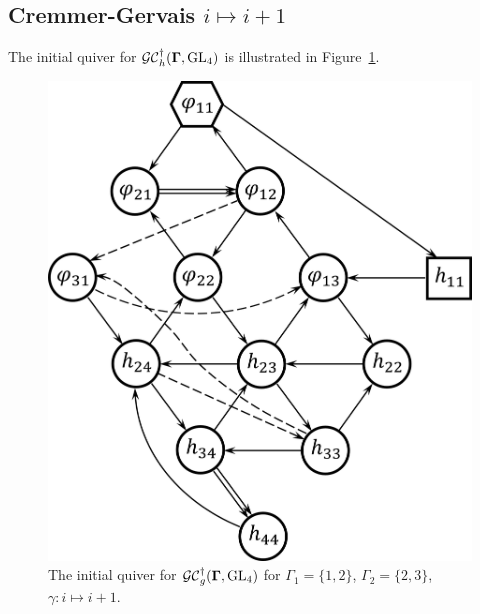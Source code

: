  \subsection{Cremmer-Gervais $i \mapsto i+1$}
The initial quiver for $\mathcal{GC}_h^{\dagger}(\mathbf{\Gamma},\operatorname{GL}_4)$ is illustrated in Figure~\ref{f:n=4_CG_i-i+1}.

\begin{figure}[htb]
\begin{center}
\includegraphics[scale=0.65]{h_convention/h_n=4_CG_i-i+1.png}
\end{center}
\caption{The initial quiver for $\mathcal{GC}^{\dagger}_g(\mathbf{\Gamma},\operatorname{GL}_4)$ for $\Gamma_1 = \{1,2\}$, $\Gamma_2 = \{2,3\}$, $\gamma:i \mapsto i+1$.}
\label{f:n=4_CG_i-i+1}
\end{figure}
 
